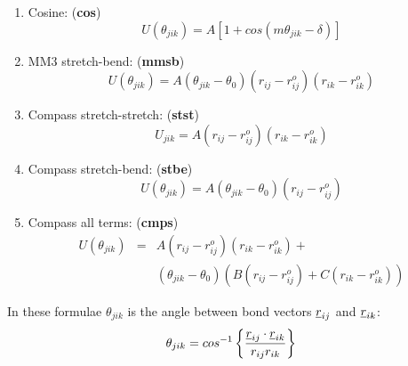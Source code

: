 \begin{enumerate}
\item Cosine: ({\bf cos})
\begin{equation}
U(\theta_{jik})=A[1+cos(m\theta_{jik}-\delta)]
\end{equation}
\item MM3 stretch-bend: ({\bf mmsb})
\begin{equation}
 U(\theta_{jik})= A (\theta_{jik} -
 \theta_0)(r_{ij}-r_{ij}^o)(r_{ik}-r_{ik}^o)
\end{equation}
\item Compass stretch-stretch: ({\bf stst})
\begin{equation}
U_{jik}=A (r_{ij}-r_{ij}^o)(r_{ik}-r_{ik}^o)
\end{equation}
\item Compass stretch-bend: ({\bf stbe})
\begin{equation}
 U(\theta_{jik})= A (\theta_{jik} -\theta_0)(r_{ij}-r_{ij}^o)
\end{equation}
\item Compass all terms: ({\bf cmps})
\begin{eqnarray}
 U(\theta_{jik})&=& A (r_{ij}-r_{ij}^o)(r_{ik}-r_{ik}^o)+ \nonumber \\
& & (\theta_{jik}-\theta_0)(B(r_{ij}-r_{ij}^o)+C(r_{ik}-r_{ik}^o))
\end{eqnarray}
\end{enumerate}
In these formulae $\theta_{jik}$ is the angle between bond vectors
$\mbox{$\underline{r}$}_{ij}$ and $\mbox{$\underline{r}$}_{ik}$:
\begin{equation}
\theta_{jik}=cos^{-1}\left\{\frac{\mbox{$\underline{r}$}_{ij}\cdot\mbox{$\underline{r}$}_{ik}}
{r_{ij}r_{ik}}\right\}
\end{equation}

